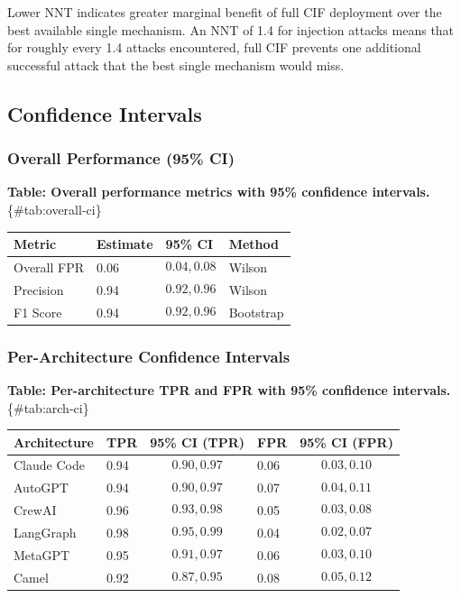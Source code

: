 \documentclass[
]{article}
\newcounter{none} %
\begin{document}
Lower NNT indicates greater marginal benefit of full CIF deployment over
the best available single mechanism. An NNT of 1.4 for injection attacks
means that for roughly every 1.4 attacks encountered, full CIF prevents
one additional successful attack that the best single mechanism would
miss.

\subsection{Confidence Intervals}\label{sec:confidence-intervals}

\subsubsection{Overall Performance (95\% CI)}\label{sec:detection-ci}

\textbf{Table: Overall performance metrics with 95\% confidence
intervals.} \{\#tab:overall-ci\}

{\def\LTcaptype{none} %
\begin{longtable}[]{@{}llll@{}}
\toprule\noalign{}
Metric & Estimate & 95\% CI & Method \\
\midrule\noalign{}
\endhead
\bottomrule\noalign{}
\endlastfoot
Overall FPR & 0.06 & \[0.04, 0.08\] & Wilson \\
Precision & 0.94 & \[0.92, 0.96\] & Wilson \\
F1 Score & 0.94 & \[0.92, 0.96\] & Bootstrap \\
\end{longtable}
}

\subsubsection{Per-Architecture Confidence Intervals}\label{sec:arch-ci}

\textbf{Table: Per-architecture TPR and FPR with 95\% confidence
intervals.} \{\#tab:arch-ci\}

{\def\LTcaptype{none} %
\begin{longtable}[]{@{}lllll@{}}
\toprule\noalign{}
Architecture & TPR & 95\% CI (TPR) & FPR & 95\% CI (FPR) \\
\midrule\noalign{}
\endhead
\bottomrule\noalign{}
\endlastfoot
Claude Code & 0.94 & \[0.90, 0.97\] & 0.06 & \[0.03, 0.10\] \\
AutoGPT & 0.94 & \[0.90, 0.97\] & 0.07 & \[0.04, 0.11\] \\
CrewAI & 0.96 & \[0.93, 0.98\] & 0.05 & \[0.03, 0.08\] \\
LangGraph & 0.98 & \[0.95, 0.99\] & 0.04 & \[0.02, 0.07\] \\
MetaGPT & 0.95 & \[0.91, 0.97\] & 0.06 & \[0.03, 0.10\] \\
Camel & 0.92 & \[0.87, 0.95\] & 0.08 & \[0.05, 0.12\] \\
\end{longtable}
}
\end{document}
